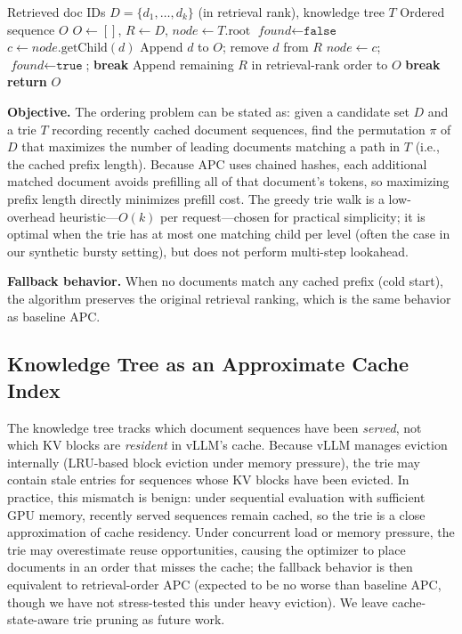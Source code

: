 \documentclass{article}
\begin{document}
\begin{algorithm}[t]
\caption{Cache-aware document ordering}
\label{alg:ordering}
\begin{algorithmic}[1]
\REQUIRE Retrieved doc IDs $D = \{d_1, \ldots, d_k\}$ (in retrieval rank), knowledge tree $T$
\ENSURE Ordered sequence $O$
\STATE $O \leftarrow []$, $R \leftarrow D$, $\textit{node} \leftarrow T.\text{root}$
    \STATE $\textit{found} \leftarrow \texttt{false}$
        \STATE $c \leftarrow \textit{node}.\text{getChild}(d)$
            \STATE Append $d$ to $O$; remove $d$ from $R$
            \STATE $\textit{node} \leftarrow c$; $\textit{found} \leftarrow \texttt{true}$; \textbf{break}
        \ENDIF
    \ENDFOR
        \STATE Append remaining $R$ in retrieval-rank order to $O$
        \STATE \textbf{break}
    \ENDIF
\ENDWHILE
\STATE \textbf{return} $O$
\end{algorithmic}
\end{algorithm}

\textbf{Objective.} The ordering problem can be stated as: given a candidate set $D$ and a trie $T$ recording recently cached document sequences, find the permutation $\pi$ of $D$ that maximizes the number of leading documents matching a path in $T$ (i.e., the cached prefix length). Because APC uses chained hashes, each additional matched document avoids prefilling all of that document's tokens, so maximizing prefix length directly minimizes prefill cost. The greedy trie walk is a low-overhead heuristic---$O(k)$ per request---chosen for practical simplicity; it is optimal when the trie has at most one matching child per level (often the case in our synthetic bursty setting), but does not perform multi-step lookahead.

\textbf{Fallback behavior.} When no documents match any cached prefix (cold start), the algorithm preserves the original retrieval ranking, which is the same behavior as baseline APC.

\subsection{Knowledge Tree as an Approximate Cache Index}

The knowledge tree tracks which document sequences have been \emph{served}, not which KV blocks are \emph{resident} in vLLM's cache. Because vLLM manages eviction internally (LRU-based block eviction under memory pressure), the trie may contain stale entries for sequences whose KV blocks have been evicted. In practice, this mismatch is benign: under sequential evaluation with sufficient GPU memory, recently served sequences remain cached, so the trie is a close approximation of cache residency. Under concurrent load or memory pressure, the trie may overestimate reuse opportunities, causing the optimizer to place documents in an order that misses the cache; the fallback behavior is then equivalent to retrieval-order APC (expected to be no worse than baseline APC, though we have not stress-tested this under heavy eviction). We leave cache-state-aware trie pruning as future work.
\end{document}
